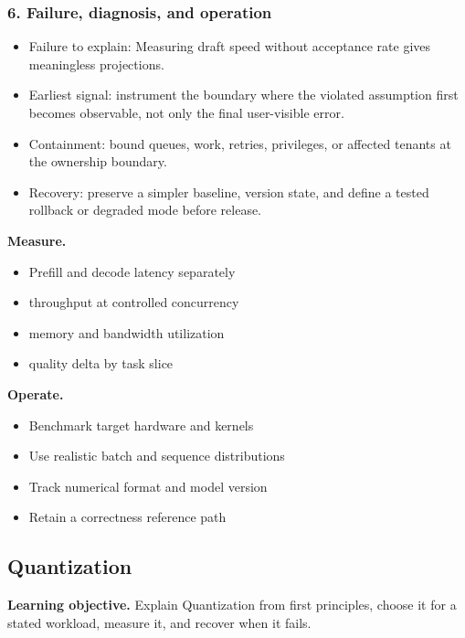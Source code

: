 \subsubsection*{6. Failure, diagnosis, and operation}
\begin{itemize}
\item Failure to explain: Measuring draft speed without acceptance rate gives meaningless projections.
\item Earliest signal: instrument the boundary where the violated assumption first becomes observable, not only the final user-visible error.
\item Containment: bound queues, work, retries, privileges, or affected tenants at the ownership boundary.
\item Recovery: preserve a simpler baseline, version state, and define a tested rollback or degraded mode before release.
\end{itemize}
\textbf{Measure.}\begin{itemize}
\item Prefill and decode latency separately
\item throughput at controlled concurrency
\item memory and bandwidth utilization
\item quality delta by task slice
\end{itemize}
\textbf{Operate.}\begin{itemize}
\item Benchmark target hardware and kernels
\item Use realistic batch and sequence distributions
\item Track numerical format and model version
\item Retain a correctness reference path
\end{itemize}
\subsection{Quantization}
\textbf{Learning objective.} Explain Quantization from first principles, choose it for a stated workload, measure it, and recover when it fails.

